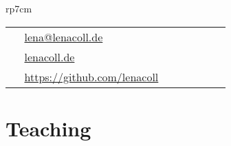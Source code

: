 \documentclass[10pt]{article} %
\newcommand{\email}[1]{{\href{mailto:#1}{#1}}}
\begin{document}
\begin{paracol}{2}
\begin{supertabular}{rp{7cm}}
	
	
	
	
	
\end{supertabular}





\switchcolumn %


\parbox[top][0.12\textheight][c]{\linewidth}{ %
	\vspace{-0.04\textheight} %
	\colorbox{shade}{ %
		\begin{supertabular}{p{0.05\linewidth}|p{0.775\linewidth}} %
			\raisebox{0pt}{\small\faEnvelope} & \email{lena@lenacoll.de} \\ %
			\raisebox{-1pt}{\small\faDesktop} & \href{https://www.lenacoll.de}{lenacoll.de} \\ %
			\raisebox{-1pt}{\faGithub} & \href{https://github.com/lenacoll}{https://github.com/lenacoll} \\ %
		\end{supertabular}
	}
}



\section{Teaching}


\end{paracol}
\end{document}
